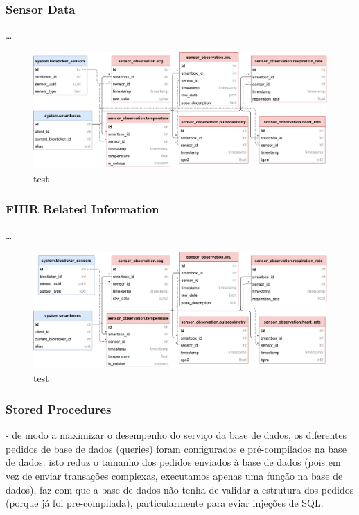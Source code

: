 \subsubsection{Sensor Data}
\dots 

\begin{figure}[H]
    \centering
    \includegraphics[width=\linewidth]{images/database-schema-sensordata.pdf}
    \caption[test]{test}
    \label{fig:wow-dbschema-sensors}
\end{figure}

\subsubsection{FHIR Related Information}
\dots 

\begin{figure}[H]
    \centering
    \includegraphics[width=\linewidth]{images/database-schema-fhir.pdf}
    \caption[test]{test}
    \label{fig:wow-dbschema-fhir}
\end{figure}


\subsubsection{Stored Procedures}

- de modo a maximizar o desempenho do serviço da base de dados, os diferentes pedidos de base de dados (queries) foram configurados e pré-compilados na base de dados. isto reduz o tamanho dos pedidos enviados à base de dados (pois em vez de enviar transações complexas, executamos apenas uma função na base de dados), faz com que a base de dados não tenha de validar a estrutura dos pedidos (porque já foi pre-compilada), particularmente para eviar injeções de SQL.

